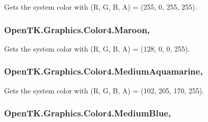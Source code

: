 Gets the system color with (R, G, B, A) = (255, 0, 255, 255). 

\hypertarget{struct_open_t_k_1_1_graphics_1_1_color4_a1858aa9fa61434b7cc548a8a7c2e674b}{
\subsubsection[{Maroon}]{ Open\-T\-K.\-Graphics.\-Color4.\-Maroon\hspace{0.3cm}{\ttfamily [static]}, {\ttfamily [get]}}}\label{struct_open_t_k_1_1_graphics_1_1_color4_a1858aa9fa61434b7cc548a8a7c2e674b}


Gets the system color with (R, G, B, A) = (128, 0, 0, 255). 

\hypertarget{struct_open_t_k_1_1_graphics_1_1_color4_a7b2c3014e316cf99c819e2c8cc85e6da}{
\subsubsection[{Medium\-Aquamarine}]{ Open\-T\-K.\-Graphics.\-Color4.\-Medium\-Aquamarine\hspace{0.3cm}{\ttfamily [static]}, {\ttfamily [get]}}}\label{struct_open_t_k_1_1_graphics_1_1_color4_a7b2c3014e316cf99c819e2c8cc85e6da}


Gets the system color with (R, G, B, A) = (102, 205, 170, 255). 

\hypertarget{struct_open_t_k_1_1_graphics_1_1_color4_a849a225a4fb22bc38284909553a07ab1}{
\subsubsection[{Medium\-Blue}]{ Open\-T\-K.\-Graphics.\-Color4.\-Medium\-Blue\hspace{0.3cm}{\ttfamily [static]}, {\ttfamily [get]}}}\label{struct_open_t_k_1_1_graphics_1_1_color4_a849a225a4fb22bc38284909553a07ab1}



